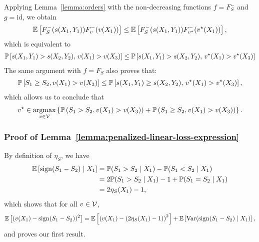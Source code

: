 Applying Lemma~\ref{lemma:orders} with the non-decreasing functions $f=F_S^-$ and $g=\text{id}$, we obtain
\begin{align*}
\mathbb{E}\left[ F_S^-(s(X_1, Y_1)) F_v^-(v(X_1)) \right] \le \mathbb{E}\left[ F_S^-(s(X_1, Y_1)) F_{v^\star}^-(v^\star(X_1)) \right],
\end{align*}
which is equivalent to
\begin{align*}
\mathbb{P}\left[ s(X_1,  Y_1) > s(X_2, Y_2), \, v(X_1) > v(X_3) \right] \le \mathbb{P}\left[ s(X_1,  Y_1) > s(X_2, Y_2), \, v^\star(X_1) > v^\star(X_3) \right]
\end{align*}
The same argument with $f=F_S$ also proves that:
\begin{align*}
 \mathbb{P}\left[ S_1 \ge S_2,  v(X_1) > v(X_3) \right] \le  \mathbb{P}\left[ s(X_1,  Y_1) \ge s(X_2, Y_2), \,  v^\star(X_1) >  v^\star(X_3) \right],
\end{align*}
which allows us to conclude that
\begin{align*}
v^\star \in \mathop{\rm argmax}_{v \in \mathcal{V}} \left\{ \mathbb{P}\left( S_1 > S_2,  v(X_1) > v(X_3) \right) + \mathbb{P}\left( S_1 \ge S_2,  v(X_1) > v(X_3) \right) \right\}.
\end{align*}

\subsubsection{Proof of Lemma~\ref{lemma:penalized-linear-loss-expression}}
\label{sec:proof-penalized-linear-loss-expression}

By definition of $\eta_S$, we have
\begin{align*}
\mathbb{E} \left[ \mathop{\rm sign}(S_1 - S_2) \mid X_1 \right] &= \mathbb{P}( S_1 > S_2 \mid X_1) -  \mathbb{P}(S_1 < S_2 \mid X_1) \\
&= 2 \mathbb{P}(S_1 > S_2 \mid X_1) - 1 + \mathbb{P}(S_1 = S_2 \mid X_1) \\
&= 2 \eta_S(X_1) - 1,
\end{align*}
which shows that for all $v \in \mathcal{V}$, 
\begin{align*}
\mathbb{E} \left[ (v(X_1) - \mathop{\rm sign}(S_1 - S_2))^2 \right] = \mathbb{E}\left[ \left( v(X_1) - (2\eta_S(X_1) -1) \right)^2 \right] + \mathbb{E}\left[ {\rm Var}(\mathop{\rm sign}(S_1 - S_2) \mid X_1) \right],
\end{align*}
and proves our first result.

